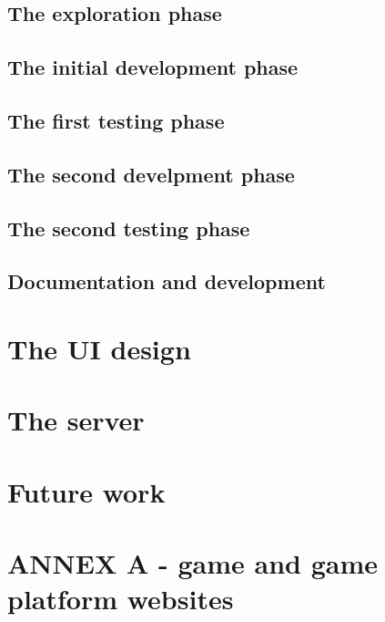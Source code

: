 \documentclass{article}
\begin{document}
\subsection{The exploration phase}

\subsection{The initial development phase}

\subsection{The first testing phase}

\subsection{The second develpment phase}

\subsection{The second testing phase}

\subsection{Documentation and development}


\section{The UI design}

\section{The server}

\section{Future work}







\section{ANNEX A - game and game platform websites}



\nocite{teamtags}
\nocite{gps1}
\end{document}
